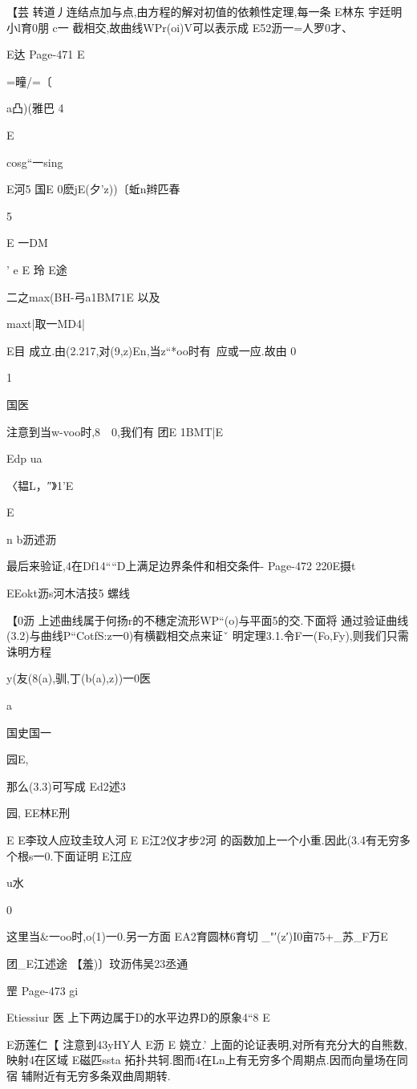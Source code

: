 {{{【芸
转道丿连结点加与点,由方程的解对初值的依赖性定理,每一条
E林东
宇廷明小l育0朋
c一
截相交,故曲线WPr(oi)V可以表示成
E52沥一=人罗0才、

E达
Page-471
E

=疃/=〔

a凸)(雅巴
4

E

cosg“一sing

E河5
国E
0麽jE(夕'z))〔蚯n辫匹春

5

E
一DM}'
e
E
玲
E途

二之max(BH-弓a1BM71E
以及

maxt|取一MD4|

E目
成立.由(2.217,对(9,z)En,当z“*oo时有~应或一应.故由
0

1

国医

注意到当w-voo时,8~~0,我们有
团E
1BMT|E

Edp
ua

〈韫L，″》1'E

E

n
b沥述沥

最后来验证,4在Df14““D上满足边界条件和相交条件-
Page-472
220E摄t

EEokt沥s河木洁技5
螺线

【0沥
上述曲线属于何扬r的不穗定流形WP“(o)与平面5的交.下面将
通过验证曲线(3.2)与曲线P“CotfS:z一0)有横戳相交点来证ˇ
明定理3.1.令F一(Fo,Fy),则我们只需诛明方程

y(友(8(a),驯,丁(b(a),z))一0医

a

国史国一

园E,

那么(3.3)可写成
Ed2述3

园,
EE林E刑

E
E李玟人应玟圭玟人河
E
E江2仪才步2河
的函数加上一个小重.因此(3.4有无穷多个根s一0.下面证明
E江应

u水

0

这里当&一oo时,o(1)一0.另一方面
EA2育圆林6育切
_"′(z′)I0亩75+_苏_F万E

团_E江述途
【羞)〕玟沥伟吴23丞通

罡
Page-473
gi

Etiessiur
医
上下两边属于D的水平边界D的原象4“8%
E

E沥莲仁【
注意到43yHY人%
E沥
E
娆立.'
上面的论证表明,对所有充分大的自熊数,映射4在区域
E磁匹ssta
拓扑共轲.图而4在Ln上有无穷多个周期点.因而向量场在同宿
辅附近有无穷多条双曲周期转.

}}
